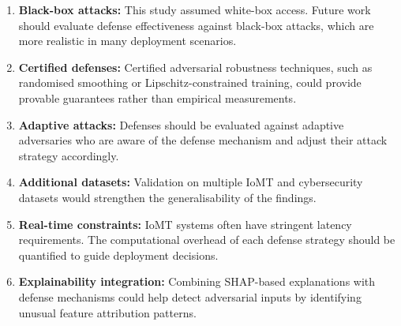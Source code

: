 \documentclass[12pt,a4paper,oneside]{report}
\begin{document}
\begin{enumerate}
    \item \textbf{Black-box attacks:} This study assumed white-box access. Future work should evaluate defense effectiveness against black-box attacks, which are more realistic in many deployment scenarios.
    \item \textbf{Certified defenses:} Certified adversarial robustness techniques, such as randomised smoothing or Lipschitz-constrained training, could provide provable guarantees rather than empirical measurements.
    \item \textbf{Adaptive attacks:} Defenses should be evaluated against adaptive adversaries who are aware of the defense mechanism and adjust their attack strategy accordingly.
    \item \textbf{Additional datasets:} Validation on multiple IoMT and cybersecurity datasets would strengthen the generalisability of the findings.
    \item \textbf{Real-time constraints:} IoMT systems often have stringent latency requirements. The computational overhead of each defense strategy should be quantified to guide deployment decisions.
    \item \textbf{Explainability integration:} Combining SHAP-based explanations with defense mechanisms could help detect adversarial inputs by identifying unusual feature attribution patterns.
\end{enumerate}
\end{document}
